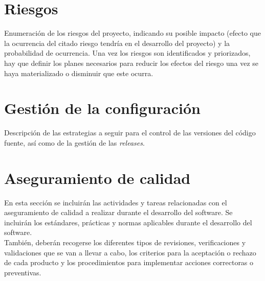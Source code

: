 \section{Riesgos}
Enumeración de los riesgos del proyecto, indicando su posible impacto (efecto que la ocurrencia del citado riesgo tendría en el desarrollo del proyecto) y la probabilidad de ocurrencia. Una vez los riesgos son identificados y priorizados, hay que definir los planes necesarios para reducir los efectos del riesgo una vez se haya materializado o disminuir que este ocurra.\\

\section{Gestión de la configuración}
Descripción de las estrategias a seguir para el control de las versiones del código fuente, así como de la gestión de las \textit{releases}.\\

\section{Aseguramiento de calidad}
En esta sección se incluirán las actividades y tareas relacionadas con el aseguramiento de calidad a realizar durante el desarrollo del software. Se incluirán los estándares, prácticas y normas aplicables durante el desarrollo del software.\\

También, deberán recogerse los diferentes tipos de revisiones, verificaciones y validaciones que se van a llevar a cabo, los criterios para la aceptación o rechazo de cada producto y los procedimientos para implementar acciones correctoras o preventivas.

